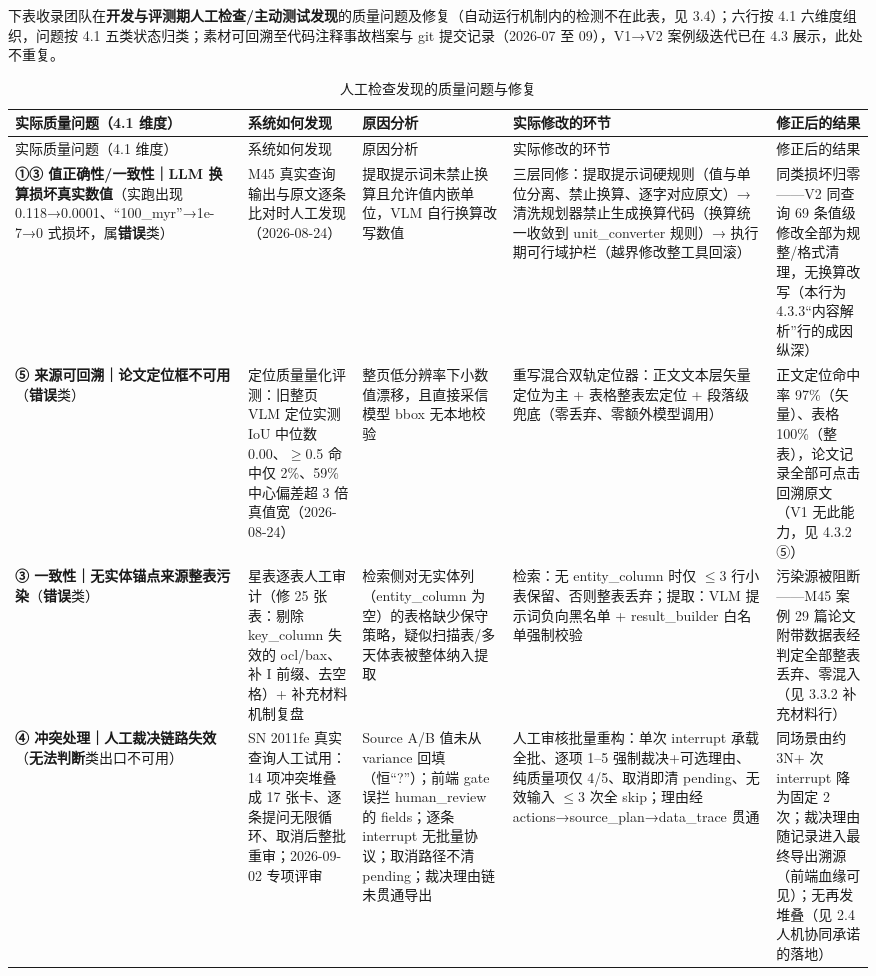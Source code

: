 下表收录团队在\textbf{开发与评测期人工检查/主动测试发现}的质量问题及修复（自动运行机制内的检测不在此表，见 3.4）；六行按 4.1 六维度组织，问题按 4.1 五类状态归类；素材可回溯至代码注释事故档案与 git 提交记录（2026-07 至 09），V1→V2 案例级迭代已在 4.3 展示，此处不重复。

\begin{longtable}{@{}p{2.4cm}p{3.0cm}p{3.0cm}p{3.4cm}p{3.2cm}@{}}
\caption{人工检查发现的质量问题与修复}\label{tab:quality-records}\\
\toprule
实际质量问题（4.1 维度） & 系统如何发现 & 原因分析 & 实际修改的环节 & 修正后的结果 \\
\midrule
\endfirsthead
\toprule
实际质量问题（4.1 维度） & 系统如何发现 & 原因分析 & 实际修改的环节 & 修正后的结果 \\
\midrule
\endhead
\textbf{①③ 值正确性/一致性｜LLM 换算损坏真实数值}（实跑出现 0.118→0.0001、“100\_myr”→1e-7→0 式损坏，属\textbf{错误}类） & M45 真实查询输出与原文逐条比对时人工发现（2026-08-24） & 提取提示词未禁止换算且允许值内嵌单位，VLM 自行换算改写数值 & 三层同修：提取提示词硬规则（值与单位分离、禁止换算、逐字对应原文）→ 清洗规划器禁止生成换算代码（换算统一收敛到 unit\_converter 规则）→ 执行期可行域护栏（越界修改整工具回滚） & 同类损坏归零——V2 同查询 69 条值级修改全部为规整/格式清理，无换算改写（本行为 4.3.3“内容解析”行的成因纵深） \\
\textbf{⑤ 来源可回溯｜论文定位框不可用}（\textbf{错误}类） & 定位质量量化评测：旧整页 VLM 定位实测 IoU 中位数 0.00、$\geq$0.5 命中仅 2\%、59\% 中心偏差超 3 倍真值宽（2026-08-24） & 整页低分辨率下小数值漂移，且直接采信模型 bbox 无本地校验 & 重写混合双轨定位器：正文文本层矢量定位为主 + 表格整表宏定位 + 段落级兜底（零丢弃、零额外模型调用） & 正文定位命中率 97\%（矢量）、表格 100\%（整表），论文记录全部可点击回溯原文（V1 无此能力，见 4.3.2 ⑤） \\
\textbf{③ 一致性｜无实体锚点来源整表污染}（\textbf{错误}类） & 星表逐表人工审计（修 25 张表：剔除 key\_column 失效的 ocl/bax、补 I 前缀、去空格）+ 补充材料机制复盘 & 检索侧对无实体列（entity\_column 为空）的表格缺少保守策略，疑似扫描表/多天体表被整体纳入提取 & 检索：无 entity\_column 时仅 $\leq$3 行小表保留、否则整表丢弃；提取：VLM 提示词负向黑名单 + result\_builder 白名单强制校验 & 污染源被阻断——M45 案例 29 篇论文附带数据表经判定全部整表丢弃、零混入（见 3.3.2 补充材料行） \\
\textbf{④ 冲突处理｜人工裁决链路失效}（\textbf{无法判断}类出口不可用） & SN 2011fe 真实查询人工试用：14 项冲突堆叠成 17 张卡、逐条提问无限循环、取消后整批重审；2026-09-02 专项评审 & Source A/B 值未从 variance 回填（恒“?”）；前端 gate 误拦 human\_review 的 fields；逐条 interrupt 无批量协议；取消路径不清 pending；裁决理由链未贯通导出 & 人工审核批量重构：单次 interrupt 承载全批、逐项 1--5 强制裁决+可选理由、纯质量项仅 4/5、取消即清 pending、无效输入 $\leq$3 次全 skip；理由经 actions→source\_plan→data\_trace 贯通 & 同场景由约 3N+ 次 interrupt 降为固定 2 次；裁决理由随记录进入最终导出溯源（前端血缘可见）；无再发堆叠（见 2.4 人机协同承诺的落地） \\

\end{longtable}
